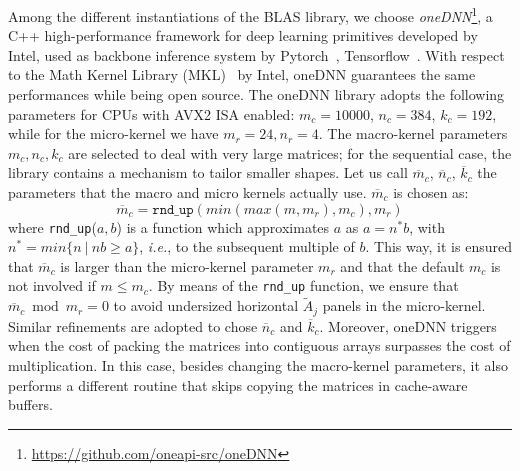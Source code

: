Among the different instantiations of the BLAS library, we choose \textit{oneDNN}\footnote{\url{https://github.com/oneapi-src/oneDNN}},
a C++ high-performance framework for deep learning primitives developed by Intel, used as backbone inference system by Pytorch~\cite{NEURIPS2019_9015}, Tensorflow~\cite{abadi2016tensorflow}. With respect to the Math Kernel Library (MKL)~\cite{wang2014intel} by Intel, oneDNN guarantees the same performances while being open source.
The oneDNN library adopts the following parameters for CPUs with AVX2 ISA enabled: $m_c = 10000$, $n_c =384 $, $k_c = 192$, while for the micro-kernel we have  $m_r = 24, n_r = 4$.
The macro-kernel parameters $m_c, n_c, k_c$  are selected to deal with very large matrices; for the sequential case, the library contains a mechanism to tailor smaller shapes. Let us call $\overline{m}_c$, $\overline{n}_c$, $\overline{k}_c$ the parameters that the macro and micro kernels actually use. 	
$\overline{m}_c$ is chosen as:
$$\overline{m}_c = \texttt{rnd\_up}(min(max(m, m_r), m_c
), m_r)$$
where \texttt{rnd\_up}($a,b$) is a function which approximates $a$ as $a = n^{*} b$, with $n^{*} = min\{n \ |\  nb \geq a\}$, \textit{i.e.}, to the subsequent multiple of $b$. This way, it is ensured that $\overline{m}_c$ is larger than the micro-kernel parameter $m_r$ and that the default $m_c$ is not involved if $m \leq m_c$. By means of the \texttt{rnd\_up} function, we ensure that $\overline{m}_c \bmod m_r  = 0$ to avoid undersized horizontal $\tilde{A}_j$ panels in the micro-kernel.  
Similar refinements are adopted to chose $\overline{n}_c$ and $\overline{k}_c$. Moreover, oneDNN triggers when the cost of packing the matrices into contiguous arrays surpasses the cost of multiplication. In this case, besides changing the macro-kernel parameters, it also performs a different routine that skips copying the matrices in cache-aware buffers.


